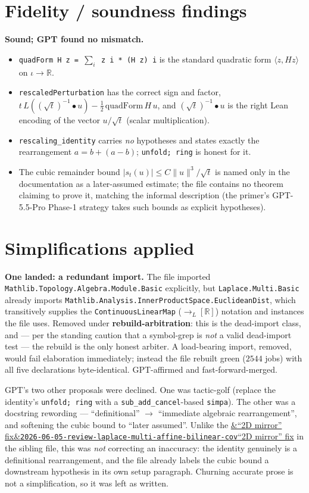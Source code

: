 \documentclass[11pt]{article}
\newcommand{\reviewref}[2][]{\href{https://therisensea.org/reviews/#2/}{\ifx&#1&\texttt{#2}\else#1\fi}}
\begin{document}
\section{Fidelity / soundness findings}
\textbf{Sound; GPT found no mismatch.}
\begin{itemize}[noitemsep]
  \item \texttt{quadForm H z = $\sum_i$ z i * (H z) i} is the standard quadratic form $\langle z,Hz\rangle$ on
    $\iota\to\mathbb R$.
  \item \texttt{rescaledPerturbation} has the correct sign and factor,
    $t\,L((\sqrt t)^{-1}\bullet u)-\tfrac12\,\mathrm{quadForm}\,H\,u$, and $(\sqrt t)^{-1}\bullet u$ is the
    right Lean encoding of the vector $u/\sqrt t$ (scalar multiplication).
  \item \texttt{rescaling\_identity} carries \emph{no} hypotheses and states exactly the rearrangement
    $a=b+(a-b)$; \texttt{unfold; ring} is honest for it.
  \item The cubic remainder bound $|s_t(u)|\le C\|u\|^3/\sqrt t$ is named only in the documentation as a
    later-assumed estimate; the file contains no theorem claiming to prove it, matching the informal
    description (the primer's GPT-5.5-Pro Phase-1 strategy takes such bounds as explicit hypotheses).
\end{itemize}

\section{Simplifications applied}
\textbf{One landed: a redundant import.} The file imported \texttt{Mathlib.Topology.Algebra.Module.Basic}
explicitly, but \texttt{Laplace.Multi.Basic} already imports
\texttt{Mathlib.Analysis.InnerProductSpace.EuclideanDist}, which transitively supplies the
\texttt{ContinuousLinearMap} ($\to_L[\mathbb R]$) notation and instances the file uses. Removed under
\textbf{rebuild-arbitration}: this is the dead-import class, and --- per the standing caution that a
symbol-grep is \emph{not} a valid dead-import test --- the rebuild is the only honest arbiter. A
load-bearing import, removed, would fail elaboration immediately; instead the file rebuilt green ($2544$
jobs) with all five declarations byte-identical. GPT-affirmed and fast-forward-merged.

GPT's two other proposals were declined. One was tactic-golf (replace the identity's \texttt{unfold; ring}
with a \texttt{sub\_add\_cancel}-based \texttt{simpa}). The other was a docstring rewording --- ``definitional''
$\to$ ``immediate algebraic rearrangement'', and softening the cubic bound to ``later assumed''. Unlike the
\reviewref[``2D mirror'' fix]{2026-06-05-review-laplace-multi-affine-bilinear-cov} in the sibling file, this
was \emph{not} correcting an inaccuracy: the identity genuinely is a definitional rearrangement, and the file
already labels the cubic bound a downstream hypothesis in its own setup paragraph. Churning accurate prose is
not a simplification, so it was left as written.
\end{document}

